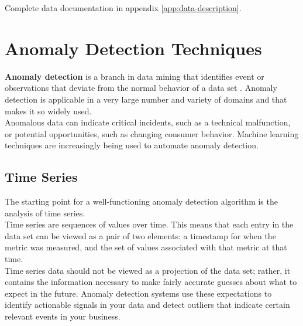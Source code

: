     \bigbreak
    
    Complete data documentation in appendix \ref{app:data-description}.
    
    
\clearpage  

\section{Anomaly Detection Techniques}
\label{sec:anomaly}

    \textbf{Anomaly detection} is a branch in data mining that identifies event or observations that deviate from the normal behavior of a data set \cite{anomaly_detection}. Anomaly detection is applicable in a very large number and variety of domains and that makes it so widely used.
    \\
    Anomalous data can indicate critical incidents, such as a technical malfunction, or potential opportunities, such as changing consumer behavior. Machine learning techniques are increasingly being used to automate anomaly detection.
    
    \subsection{Time Series}
    The starting point for a well-functioning anomaly detection algorithm is the analysis of time series.
    \\
    Time series are sequences of values over time. This means that each entry in the data set can be viewed as a pair of two elements: a timestamp for when the metric was measured, and the set of values associated with that metric at that time. 
    \\ 
    Time series data should not be viewed as a projection of the data set; rather, it contains the information necessary to make fairly accurate guesses about what to expect in the future. Anomaly detection systems use these expectations to identify actionable signals in your data and detect outliers that indicate certain relevant events in your business.
    

